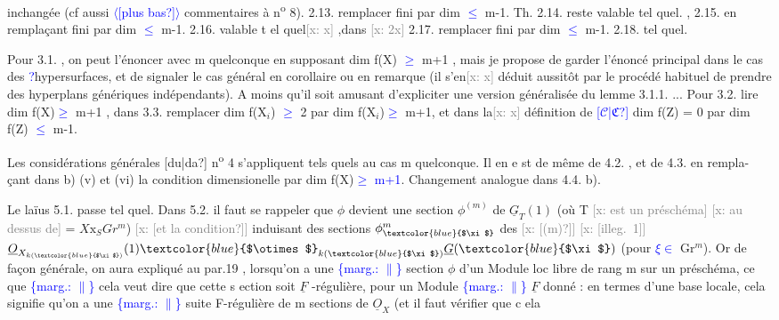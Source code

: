 \documentclass[11pt]{article}
\newcommand{\scanpage}[1]{\par\bigskip\noindent{\small\sffamily[scan #1]}\par}
\newcommand{\mspage}[1]{{\small\sffamily[p.\,#1]}}
\newcommand{\hand}[1]{\textcolor{blue}{#1}}
\newcommand{\inserted}[2][]{\textcolor{blue}{$\langle$#2$\rangle$}}
\newcommand{\margin}[1]{\textcolor{blue}{\{\textsf{marg.:} #1\}}}
\newcommand{\xout}[1]{\textcolor{gray}{[\textsf{x:} #1]}}
\newcommand{\unsure}[1]{[#1?]}
\newcommand{\illegible}[1]{[\textsf{illeg.\ #1}]}
\begin{document}
inchangée (cf aussi \inserted{\unsure{plus bas}} commentaires à n\textsuperscript{o} 8). 2.13. remplacer fini
par dim \hand{$\leqslant$} m-1. Th. 2.14. reste valable tel quel. , 2.15. en
remplaçant fini par dim \hand{$\leqslant$} m-1. 2.16. valable t el quel\xout{x} ,dans
\xout{2x} 2.17. remplacer fini par dim \hand{$\leqslant$} m-1. 2.18. tel quel.

Pour 3.1. , on peut l'énoncer avec m quelconque en supposant
dim f(X) \hand{$\geqslant$} m+1 , mais je propose de garder l'énoncé principal dans
le cas des \hand{?}hypersurfaces, et de signaler le cas général en corollaire
ou en remarque (il s'en\xout{x} déduit aussitôt par le procédé habituel de
prendre des hyperplans génériques indépendants). A moins qu'il soit
amusant d'expliciter une version généralisée du lemme 3.1.1. ...
Pour 3.2. lire dim f(X)\hand{$\geqslant$} m+1 , dans 3.3. remplacer dim f(X$_i$) \hand{$\geqslant$} 2
par dim f(X$_i$)\hand{$\geqslant$} m+1, et dans la\xout{x} définition de \hand{\unsure{$\mathcal{C}$|$\mathfrak{C}$}} dim f(Z) = 0
par dim f(Z) \hand{$\leqslant$} m-1.

Les considérations générales \unsure{du|da} n\textsuperscript{o} 4 s'appliquent tels quels
au cas m quelconque. Il en e st de même de 4.2. , et de 4.3. en rempla-%
çant dans b) (v) et (vi) la condition dimensionelle par
dim f(X)\hand{$\geqslant$ m+1}. Changement analogue dans 4.4. b).

Le laïus 5.1. passe tel quel. Dans 5.2. il faut se rappeler
que $\phi$ devient une section $\phi^{(m)}$ de $\underline{G}_T(1)$ (où T \xout{est un préschéma}
\xout{au dessus de} = $X\mathrm{x}_S Gr^m$) \xout{\unsure{et la condition}} induisant des sections
$\phi^m_{\hand{$\xi$}}$ des \xout{\unsure{(m)}} \xout{\illegible{1}} $\underline{O}_{X_{k(\hand{$\xi$})}}(1)\hand{$\otimes$}_{k(\hand{$\xi$})}\underline{G}(\hand{$\xi$})$ (pour \hand{$\xi \in$} Gr$^m$). Or
de façon générale, on aura expliqué au par.19 , lorsqu'on a une
\margin{$\|$} section $\phi$ d'un Module loc libre de rang m sur un préschéma, ce que
\margin{$\|$} cela veut dire que cette s ection soit $\underline{F}$ -régulière, pour un Module
\margin{$\|$} $\underline{F}$ donné : en termes d'une base locale, cela signifie qu'on a une
\margin{$\|$} suite F-régulière de m sections de $\underline{O}_X$ (et il faut vérifier que c ela

\mspage{69}

\clearpage
\scanpage{25/70}
\mspage{65}
\end{document}
